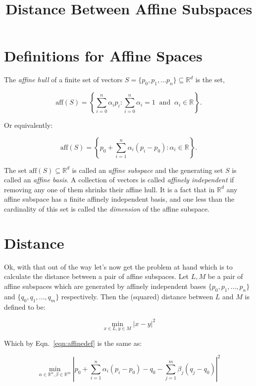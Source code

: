 \documentclass{article}[11pt]
\title{Distance Between Affine Subspaces}
\begin{document}
\maketitle

\section{Definitions for Affine Spaces}

The \emph{affine hull} of a finite set of vectors $S = \{ p_0, p_1, ... p_n \} \subseteq \mathbb{R}^d$ is the set,

\[ \text{aff}(S) = \left \{ \sum_{i=0}^n \alpha_i p_i : \sum_{i=0}^{n} \alpha_i = 1 \: \text{ and } \: \alpha_i \in \mathbb{R} \right \} . \]

Or equivalently:

\begin{equation}
\label{eqn:affinedef}
\text{aff}(S) = \left \{ p_0 + \sum_{i=1}^n \alpha_i (p_i - p_0) : \alpha_i \in \mathbb{R} \right \} .
\end{equation}

The set $\text{aff}(S) \subseteq \mathbb{R}^d$ is called an \emph{affine subspace} and the generating set $S$ is called an \emph{affine basis}.  A collection of vectors is called \emph{affinely independent} if removing any one of them shrinks their affine hull.  It is a fact that in $\mathbb{R}^d$ any affine subspace has a finite affinely independent basis, and one less than the cardinality of this set is called the \emph{dimension} of the affine subspace.

\section{Distance}

Ok, with that out of the way let's now get the problem at hand which is to calculate the distance between a pair of affine subspaces.  Let $L, M$ be a pair of affine subspaces which are generated by affinely independent bases $\{ p_0, p_1, ..., p_n \}$ and $\{ q_0, q_1, ..., q_m \}$ respectively.  Then the (squared) distance between $L$ and $M$ is defined to be:

\[ \min_{ x \in L, y \in M } | x - y |^2 \]

Which by Eqn.~\ref{eqn:affinedef} is the same as:

\[ \min_{ \alpha \in \mathbb{R}^n, \beta \in \mathbb{R}^m } | p_0 + \sum_{i=1}^n \alpha_i (p_i - p_0) - q_0 - \sum_{j=1}^m \beta_j (q_j - q_0) |^2 \]
\end{document}
